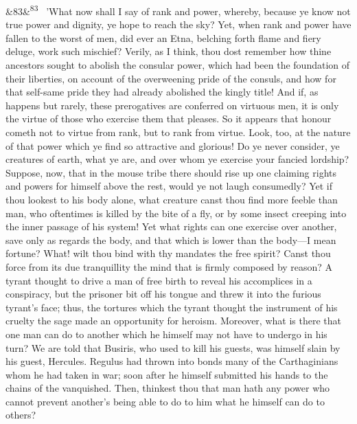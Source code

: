 \documentclass[12pt]{article}
\newcommand{\para}[1][]{\par\noindent\ifx&#1&\else\textsuperscript{\footnotesize #1}~\fi}
\begin{document}
\para[83] 'What now shall I say of rank and power, whereby, because ye know not true power and dignity, ye hope to reach the sky? Yet, when rank and power have fallen to the worst of men, did ever an Etna, belching forth flame and fiery deluge, work such mischief? Verily, as I think, thou dost remember how thine ancestors sought to abolish the consular power, which had been the foundation of their liberties, on account of the overweening pride of the consuls, and how for that self-same pride they had already abolished the kingly title! And if, as happens but rarely, these prerogatives are conferred on virtuous men, it is only the virtue of those who exercise them that pleases. So it appears that honour cometh not to virtue from rank, but to rank from virtue. Look, too, at the nature of that power which ye find so attractive and glorious! Do ye never consider, ye creatures of earth, what ye are, and over whom ye exercise your fancied lordship? Suppose, now, that in the mouse tribe there should rise up one claiming rights and powers for himself above the rest, would ye not laugh consumedly? Yet if thou lookest to his body alone, what creature canst thou find more feeble than man, who oftentimes is killed by the bite of a fly, or by some insect creeping into the inner passage of his system! Yet what rights can one exercise over another, save only as regards the body, and that which is lower than the body---I mean fortune? What! wilt thou bind with thy mandates the free spirit? Canst thou force from its due tranquillity the mind that is firmly composed by reason? A tyrant thought to drive a man of free birth to reveal his accomplices in a conspiracy, but the prisoner bit off his tongue and threw it into the furious tyrant's face; thus, the tortures which the tyrant thought the instrument of his cruelty the sage made an opportunity for heroism. Moreover, what is there that one man can do to another which he himself may not have to undergo in his turn? We are told that Busiris, who used to kill his guests, was himself slain by his guest, Hercules. Regulus had thrown into bonds many of the Carthaginians whom he had taken in war; soon after he himself submitted his hands to the chains of the vanquished. Then, thinkest thou that man hath any power who cannot prevent another's being able to do to him what he himself can do to others?
\end{document}
